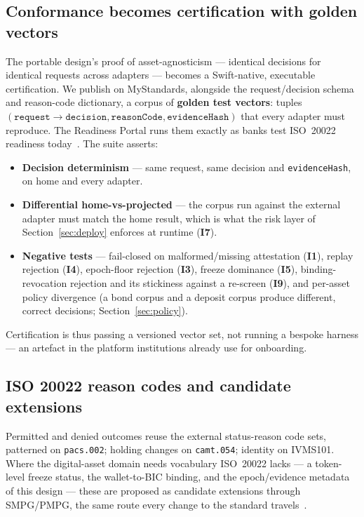 \documentclass[11pt,a4paper]{article}
\newcommand{\Iref}[1]{\textbf{I#1}}
\begin{document}
\subsection{Conformance becomes certification with golden vectors}
The portable design's proof of asset-agnosticism --- identical decisions for
identical requests across adapters --- becomes a Swift-native, executable
certification. We publish on MyStandards, alongside the request/decision schema
and reason-code dictionary, a corpus of \textbf{golden test vectors}: tuples
$(\texttt{request} \rightarrow \texttt{decision}, \texttt{reasonCode},
\texttt{evidenceHash})$ that every adapter must reproduce. The Readiness Portal
runs them exactly as banks test ISO~20022 readiness today~\cite{swiftmystd}. The
suite asserts:
\begin{itemize}[leftmargin=1.4em,itemsep=2pt]
  \item \textbf{Decision determinism} --- same request, same decision and
  \texttt{evidenceHash}, on home and every adapter.
  \item \textbf{Differential home-vs-projected} --- the corpus run against the
  external adapter must match the home result, which is what the risk layer of
  Section~\ref{sec:deploy} enforces at runtime (\Iref{7}).
  \item \textbf{Negative tests} --- fail-closed on malformed/missing attestation
  (\Iref{1}), replay rejection (\Iref{4}), epoch-floor rejection (\Iref{3}),
  freeze dominance (\Iref{5}), binding-revocation rejection and its stickiness
  against a re-screen (\Iref{9}), and per-asset policy divergence (a bond corpus
  and a deposit corpus produce different, correct decisions;
  Section~\ref{sec:policy}).
\end{itemize}
Certification is thus passing a versioned vector set, not running a bespoke
harness --- an artefact in the platform institutions already use for onboarding.

\subsection{ISO 20022 reason codes and candidate extensions}
Permitted and denied outcomes reuse the external status-reason code sets,
patterned on \texttt{pacs.002}; holding changes on \texttt{camt.054}; identity on
IVMS101. Where the digital-asset domain needs vocabulary ISO~20022 lacks --- a
token-level freeze status, the wallet-to-BIC binding, and the epoch/evidence
metadata of this design --- these are proposed as candidate extensions through
SMPG/PMPG, the same route every change to the standard travels~\cite{swiftsmpg}.
\end{document}
